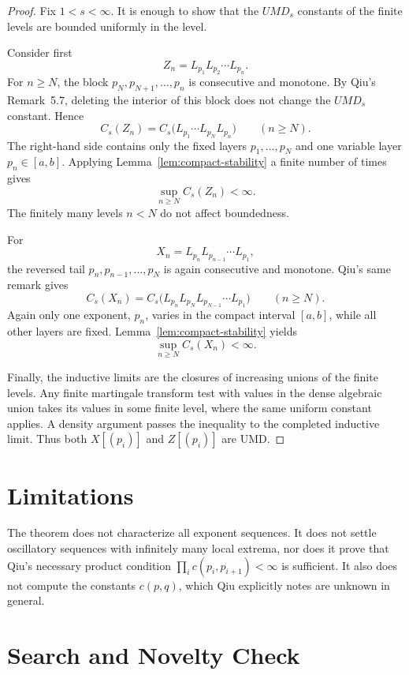 \documentclass[11pt]{article}
\begin{document}
\begin{proof}
Fix \(1<s<\infty\).  It is enough to show that the \(UMD_s\) constants of the
finite levels are bounded uniformly in the level.

Consider first
\[
  Z_n=L_{p_1}L_{p_2}\cdots L_{p_n}.
\]
For \(n\ge N\), the block \(p_N,p_{N+1},\ldots,p_n\) is consecutive and
monotone.  By Qiu's Remark~5.7, deleting the interior of this block does not
change the \(UMD_s\) constant.  Hence
\[
  C_s(Z_n)
  =
  C_s\bigl(L_{p_1}\cdots L_{p_N}L_{p_n}\bigr)
  \qquad (n\ge N).
\]
The right-hand side contains only the fixed layers
\(p_1,\ldots,p_N\) and one variable layer \(p_n\in[a,b]\).  Applying
Lemma~\ref{lem:compact-stability} a finite number of times gives
\[
  \sup_{n\ge N} C_s(Z_n) < \infty.
\]
The finitely many levels \(n<N\) do not affect boundedness.

For
\[
  X_n=L_{p_n}L_{p_{n-1}}\cdots L_{p_1},
\]
the reversed tail \(p_n,p_{n-1},\ldots,p_N\) is again consecutive and
monotone.  Qiu's same remark gives
\[
  C_s(X_n)
  =
  C_s\bigl(L_{p_n}L_{p_N}L_{p_{N-1}}\cdots L_{p_1}\bigr)
  \qquad (n\ge N).
\]
Again only one exponent, \(p_n\), varies in the compact interval \([a,b]\),
while all other layers are fixed.  Lemma~\ref{lem:compact-stability} yields
\[
  \sup_{n\ge N} C_s(X_n) < \infty.
\]

Finally, the inductive limits are the closures of increasing unions of the
finite levels.  Any finite martingale transform test with values in the dense
algebraic union takes its values in some finite level, where the same uniform
constant applies.  A density argument passes the inequality to the completed
inductive limit.  Thus both \(X[(p_i)]\) and \(Z[(p_i)]\) are UMD.
\end{proof}

\section*{Limitations}

The theorem does not characterize all exponent sequences.  It does not settle
oscillatory sequences with infinitely many local extrema, nor does it prove
that Qiu's necessary product condition \(\prod_i c(p_i,p_{i+1})<\infty\) is
sufficient.  It also does not compute the constants \(c(p,q)\), which Qiu
explicitly notes are unknown in general.

\section*{Search and Novelty Check}
\end{document}
